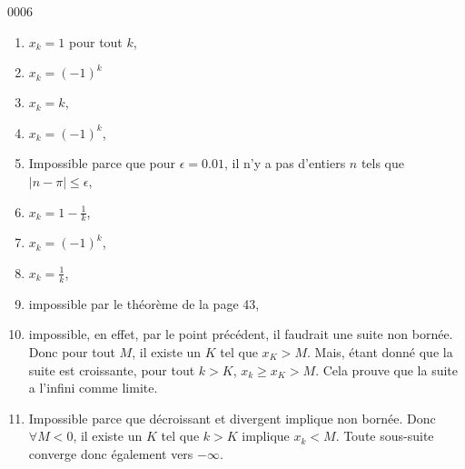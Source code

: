
\begin{corrige}{0006}

\begin{enumerate}
\item $x_k=1$ pour tout $k$,
\item $x_k=(-1)^k$
\item $x_k=k$,
\item $x_k=(-1)^k$,
\item Impossible parce que pour $\epsilon=0.01$, il n'y a pas d'entiers $n$ tels que $| n-\pi |\leq\epsilon$,
\item $x_k=1-\frac{1}{ k }$,
\item $x_k=(-1)^k$,
\item $x_k=\frac{1}{ k }$,
\item impossible par le théorème de la page 43,
\item impossible, en effet, par le point précédent, il faudrait une suite non bornée. Donc pour tout $M$, il existe un $K$ tel que $x_K>M$. Mais, étant donné que la suite est croissante, pour tout $k>K$, $x_k\geq x_K>M$. Cela prouve que la suite a l'infini comme limite.
\item Impossible parce que décroissant et divergent implique non bornée. Donc $\forall M<0$, il existe un $K$ tel que $k>K$ implique $x_k<M$. Toute sous-suite \og converge\fg{}  donc également vers $-\infty$.
\end{enumerate}


\end{corrige}
